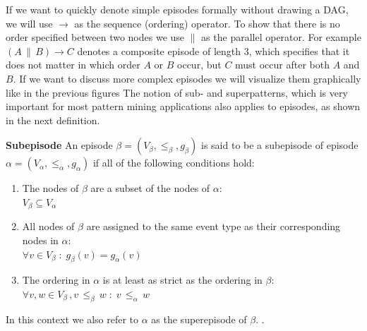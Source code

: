 If we want to quickly denote simple episodes formally without drawing a DAG, we will use $\rightarrow$ as the sequence (ordering) operator. To show that there is no order specified between two nodes we use $\|$ as the parallel operator. For example $(A \, \| \, B ) \rightarrow C$ denotes a composite episode of length 3, which specifies that it does not matter in which order $A$ or $B$ occur, but $C$ must occur after both $A$ and $B$. If we want to discuss more complex episodes we will visualize them graphically like in the previous figures \newline  
The notion of sub- and superpatterns, which is very important for most pattern mining applications also applies to episodes, as shown in the next definition.

\begin{mydef}
\label{def_subEpisode}
\textbf{Subepisode} An episode $\beta = (V_\beta,{\leq}_{\beta},g_\beta)$ is said to be a subepisode of episode $\alpha = (V_\alpha,{\leq}_{\alpha},g_\alpha)$ if all of the following conditions hold:
\begin{enumerate}
	\item The nodes of $\beta$ are a subset of the nodes of $\alpha$: \\
	$V_\beta \subseteq V_\alpha$
	\item All nodes of $\beta$ are assigned to the same event type as their corresponding nodes in $\alpha$:\\
	 $\forall v \in V_\beta \; : \; g_{\beta}(v) = g_\alpha (v) $
	\item The ordering in $\alpha$ is at least as strict as the ordering in $\beta$:\\
	$\forall v,w \in V_\beta \, , v \, {\leq}_{\beta} \, w \; : \; v \, {\leq}_{\alpha} \, w$
\end{enumerate}
In this context we also refer to $\alpha$ as the superepisode of $\beta$. \cite{mannila1995discovering,laxman2007fast}.
\end{mydef}

